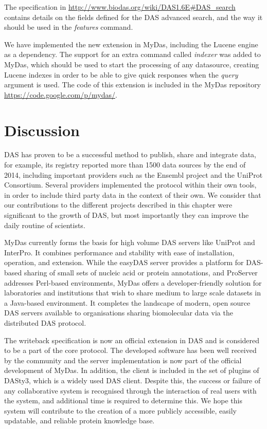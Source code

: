 The specification in \url{http://www.biodas.org/wiki/DAS1.6E#DAS\_search} contains details on the fields defined for the DAS advanced search, and the way it should be used in the \emph{features} command.

We have implemented the new extension in MyDas, including the Lucene engine as a dependency. The support for an extra command called \emph{indexer} was added to MyDas, which should be used to start the processing of any datasource, creating Lucene indexes in order to be able to give quick responses when the \emph{query} argument is used. The code of this extension is included in the MyDas repository \url{https://code.google.com/p/mydas/}.

\section{Discussion}
DAS has proven to be a successful method to publish, share and integrate data, for example, its registry reported more than 1500 data sources by the end of 2014, including important providers such as the Ensembl project and the UniProt Consortium. Several providers implemented the protocol within their own tools, in order to include third party data in the context of their own. We consider that our contributions to the different projects described in this chapter were significant to the growth of DAS, but most importantly they can improve the daily routine of scientists.

MyDas currently forms the basis for high volume DAS servers like UniProt and InterPro. It combines performance and stability with ease of installation, operation, and extension. While the easyDAS server provides a platform for DAS-based sharing of small sets of nucleic acid or protein annotations, and ProServer addresses Perl-based environments, MyDas offers a developer-friendly solution for laboratories and institutions that wish to share medium to large scale datasets in a Java-based environment. It completes the landscape of modern, open source DAS servers available to organisations sharing biomolecular data via the distributed DAS protocol. 

The writeback specification is now an official extension in DAS and is considered to be a part of the core protocol. The developed software has been well received by the community and the server implementation is now part of the official development of MyDas. In addition, the client is included in the set of plugins of DASty3, which is a widely used DAS client. Despite this, the success or failure of any collaborative system is recognised through the interaction of real users with the system, and additional time is required to determine this. We hope this system will contribute to the creation of a more publicly accessible, easily updatable, and reliable protein knowledge base.

